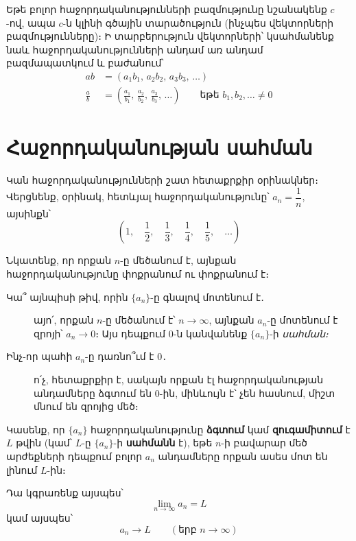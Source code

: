 Եթե բոլոր հաջորդականությունների բազմությունը նշանակենք $c$-ով, ապա $c$-ն կլինի գծային տարածություն (ինչպես վեկտորների բազմու\-թյունները)։ Ի տարբերություն վեկտորների՝ կսահմանենք նաև հաջոր\-դա\-կանությունների անդամ առ անդամ բազմապատկում և բաժանում՝
\begin{align*}
ab &= (a_1b_1,\, a_2b_2,\, a_3b_3,\, \dots) \\
\frac{a}{b}&=
\left(\frac{a_1}{b_1},\, \frac{a_2}{b_2},\, \frac{a_3}{b_3},\, \dots\right) \qquad \text{եթե $b_1, b_2, \dots \ne 0$}
\end{align*}


\section{Հաջորդականության սահման}

Կան հաջորդականությունների շատ հետաքրքիր օրինակներ։ Վերցնենք, օրինակ, հետևյալ հաջորդականությունը՝ $a_n = \dfrac{1}{n}$, այսինքն՝
\[
\left(1,\quad  \frac{1}{2},\quad \frac{1}{3},\quad \frac{1}{4},\quad \frac{1}{5},\quad \dots\right)
\]

Նկատենք, որ որքան $n$-ը մեծանում է, այնքան հաջորդականությունը փոքրանում ու փոքրանում է։ 

\begin{description}
    \item[Կա՞ այնպիսի թիվ, որին $\{a_n\}$-ը գնալով մոտենում է․] այո՛, որքան $n$-ը մեծանում է՝ $n\to\infty$, այնքան $a_n$-ը մոտենում է զրոյի՝ $a_n\to 0$։ Այս դեպքում $0$-ն կանվանենք $\{a_n\}$-ի \textit{սահման։}

    \item[Ինչ-որ պահի $a_n$-ը դառնո՞ւմ է $0$․] ո՛չ, հետաքրքիր է, սակայն որքան էլ հաջորդականության անդամները ձգտում են $0$-ին, մինևույն է՝ չեն հասնում, միշտ մնում են զրոյից մեծ։
\end{description}

\begin{definition}
Կասենք, որ  $\{a_n\}$ հաջորդականությունը \textbf{ձգտում} կամ \textbf{զուգամիտում} է $L$ թվին (կամ՝ $L$-ը $\{a_n\}$-ի \textbf{սահմանն} է), եթե $n$-ի բավարար մեծ արժեքների դեպքում բոլոր $a_n$ անդամները որքան ասես մոտ են լինում $L$-ին։

Դա կգրառենք այսպես՝
\[
\lim_{n\to\infty} a_n = L
\]
կամ այսպես՝
\[
a_n \to L \qquad (\text{երբ } n\to\infty)
\]
\end{definition}

